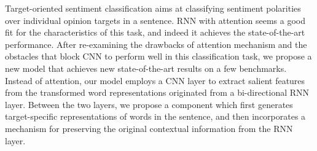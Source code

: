 Target-oriented sentiment classification aims at classifying sentiment polarities over individual opinion targets in a sentence. RNN with attention seems a good fit for the characteristics of this task, and indeed it achieves the state-of-the-art performance. After re-examining the drawbacks of attention mechanism and the obstacles that block CNN to perform well in this classification task, we propose a new model that achieves new state-of-the-art results on a few benchmarks. Instead of attention, our model employs a CNN layer to extract salient features from the transformed word representations originated from a bi-directional RNN layer. Between the two layers, we propose a component which first generates target-specific representations of words in the sentence, and then incorporates a mechanism for preserving the original contextual information from the RNN layer.
